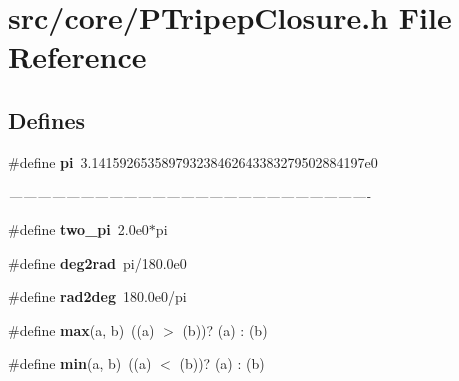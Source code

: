\section{src/core/PTripep\-Closure.h File Reference}
\label{PTripepClosure_8h}


\subsection*{Defines}
\begin{CompactItemize}
\item 
\#define {\bf pi}~3.141592653589793238462643383279502884197e0
\begin{CompactList}\small\item\em ---------------------------------------------------------------------------- \item\end{CompactList}\item 
\#define {\bf two\_\-pi}~2.0e0$\ast$pi
\item 
\#define {\bf deg2rad}~pi/180.0e0
\item 
\#define {\bf rad2deg}~180.0e0/pi
\item 
\#define {\bf max}(a, b)~((a) $>$ (b))? (a) : (b)
\item 
\#define {\bf min}(a, b)~((a) $<$ (b))? (a) : (b)
\end{CompactItemize}
